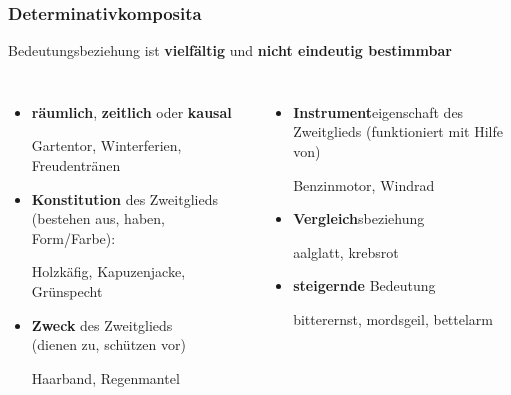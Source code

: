 \begin{frame}
\frametitle{Determinativkomposita}


Bedeutungsbeziehung ist \textbf{vielfältig} und \textbf{nicht eindeutig bestimmbar}

\begin{columns}
	

\begin{itemize}

	\item \textbf{räumlich},  \textbf{zeitlich} oder \textbf{kausal}
	
	\ea Gartentor, Winterferien, Freudentränen
	\z
	
	\item \textbf{Konstitution} des Zweitglieds (bestehen aus, haben, Form/Farbe):
	
	\ea Holzkäfig, Kapuzenjacke, Grünspecht
	\z

	\item \textbf{Zweck} des Zweitglieds \\
	(dienen zu, schützen vor)

	\ea Haarband, Regenmantel
	\z	
\end{itemize}

	
\begin{itemize}
	\item \textbf{Instrument}eigenschaft des Zweitglieds (funktioniert mit Hilfe von)
	
	\ea Benzinmotor, Windrad
	\z
	
	\item \textbf{Vergleich}sbeziehung
	
	\ea aalglatt, krebsrot
	\z
	
	\item \textbf{steigernde} Bedeutung
	
	\ea bitterernst, mordsgeil, bettelarm
	\z
\end{itemize}

\end{columns}
	
\end{frame}



